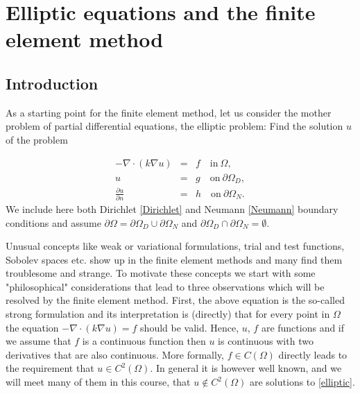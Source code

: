 \chapter{Elliptic equations and the finite element method}




\label{elliptic}
\section{Introduction}

As a starting point for the finite element method, let us
consider the mother problem of partial differential equations, 
the elliptic problem: Find the solution $u$ of the problem

\begin{eqnarray}
\label{elliptic}
-\nabla\cdot(k\nabla u)  &=& f \quad \textrm{in}\ \Omega,\\
\label{Dirichlet}
u&=& g \quad \textrm{on}\ \partial\Omega_D, \\
\label{Neumann}
\frac{\partial u}{\partial n}&=& h \quad \textrm{on}\ \partial\Omega_N . 
\end{eqnarray}
We include here both Dirichlet \eqref{Dirichlet} and Neumann \eqref{Neumann} boundary conditions
and assume $\partial \Omega = \partial \Omega_D \cup \partial \Omega_N$ 
and $\partial \Omega_D \cap \partial \Omega_N = \emptyset$.
 

Unusual concepts like weak or variational formulations, trial and test functions, Sobolev
spaces etc. show up in the finite element methods and many find them troublesome and strange. To motivate
these concepts we start with some "philosophical" considerations that lead to three observations which 
will be resolved by the finite element method. First, the above equation is 
the so-called strong formulation and its interpretation is (directly) that for every point in $\Omega$
the equation $ -\nabla\cdot(k\nabla u)  = f$ should be valid. Hence, $u$, $f$ are functions and
if we assume that $f$ is a continuous function then $u$ is continuous with two derivatives that are also continuous.   
More formally, $f\in C(\Omega)$ directly leads to the requirement that $u\in C^2(\Omega)$. In general 
it is however well known, and we will meet many of them in this course, that $u \not \in C^2(\Omega)$ are
solutions to \eqref{elliptic}. 



